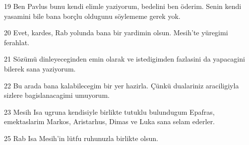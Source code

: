 \par 19 Ben Pavlus bunu kendi elimle yaziyorum, bedelini ben öderim. Senin kendi yasamini bile bana borçlu oldugunu söylememe gerek yok.
\par 20 Evet, kardes, Rab yolunda bana bir yardimin olsun. Mesih'te yüregimi ferahlat.
\par 21 Sözümü dinleyeceginden emin olarak ve istedigimden fazlasini da yapacagini bilerek sana yaziyorum.
\par 22 Bu arada bana kalabilecegim bir yer hazirla. Çünkü dualariniz araciligiyla sizlere bagislanacagimi umuyorum.
\par 23 Mesih Isa ugruna kendisiyle birlikte tutuklu bulundugum Epafras, emektaslarim Markos, Aristarhus, Dimas ve Luka sana selam ederler.
\par 25 Rab Isa Mesih'in lütfu ruhunuzla birlikte olsun.


